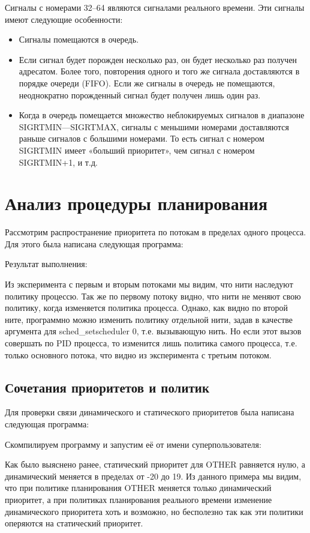 \documentclass[a4paper]{article}
\begin{document}
	Сигналы с номерами 32--64 являются сигналами реального времени. Эти сигналы имеют следующие особенности:
	\begin{itemize}
		\item Сигналы помещаются в очередь.
		\item Если сигнал будет порожден несколько раз, он будет несколько раз получен адресатом. Более того, повторения одного и того же сигнала доставляются в порядке очереди (FIFO). Если же сигналы в очередь не помещаются, неоднократно порожденный сигнал будет получен лишь один раз.
		\item Когда в очередь помещается множество неблокируемых сигналов в диапазоне SIGRTMIN—SIGRTMAX, сигналы с меньшими номерами доставляются раньше сигналов с большими номерами. То есть сигнал с номером SIGRTMIN имеет «больший приоритет», чем сигнал с номером SIGRTMIN+1, и т.д.
	\end{itemize}

	\section{Анализ процедуры планирования}
	Рассмотрим распространение приоритета по потокам в пределах одного процесса. Для этого была написана следующая программа:
	
	Результат выполнения:
	
	Из эксперимента с первым и вторым потоками мы видим, что нити наследуют политику процессю. Так же по первому потоку видно, что нити не меняют свою политику, когда изменяется политика процесса. Однако, как видно по второй ните, программно можно изменить политику отдельной нити, задав в качестве аргумента для sched\_setscheduler 0, т.е. вызывающую нить. Но если этот вызов совершать по PID процесса, то изменится лишь политика самого процесса, т.е. только основного потока, что видно из эксперимента с третьим потоком.

\subsection{Сочетания приоритетов и политик}
	Для проверки связи динамического и статического приоритетов была написана следующая программа:
	
	Скомпилируем программу и запустим её от имени суперпользователя:
	
	Как было выяснено ранее, статический приоритет для OTHER равняется нулю, а динамический меняется в пределах от -20 до 19. Из данного примера мы видим, что при политике планирования OTHER меняется только динамический приоритет, а при политиках планирования реального времени изменение динамического приоритета хоть и возможно, но бесполезно так как эти политики оперяются на статический приоритет. 
\end{document}
